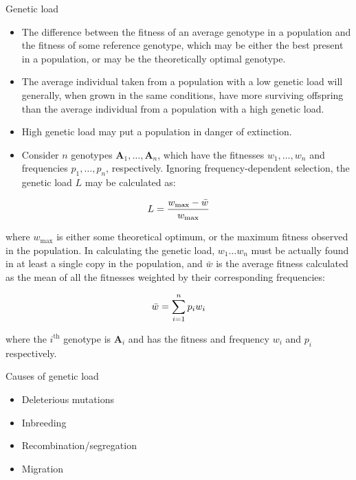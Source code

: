 \documentclass[11pt,dvipsnames,ignorenonframetext,aspectratio=169]{beamer}
\providecommand{\tightlist}{%
  \setlength{\itemsep}{0pt}\setlength{\parskip}{0pt}}
\begin{document}
\begin{frame}{Genetic load}
\protect\hypertarget{genetic-load}{}
\footnotesize

\begin{itemize}
\tightlist
\item
  The difference between the fitness of an average genotype in a
  population and the fitness of some reference genotype, which may be
  either the best present in a population, or may be the theoretically
  optimal genotype.
\item
  The average individual taken from a population with a low genetic load
  will generally, when grown in the same conditions, have more surviving
  offspring than the average individual from a population with a high
  genetic load.
\item
  High genetic load may put a population in danger of extinction.
\item
  Consider \(n\) genotypes \(\mathbf{A}_{1},\dots ,\mathbf{A}_{n}\),
  which have the fitnesses \(w_{1},\dots, w_{n}\) and frequencies
  \(p_{1},\dots, p_{n}\), respectively. Ignoring frequency-dependent
  selection, the genetic load \(L\) may be calculated as:
\end{itemize}

\[
\small
L={{w_{\max }-{\bar {w}}} \over w_{\max }}
\]
\end{frame}

\begin{frame}{}
\protect\hypertarget{section-29}{}
where \(w_{\max }\) is either some theoretical optimum, or the maximum
fitness observed in the population. In calculating the genetic load,
\(w_{1}\dots w_{n}\) must be actually found in at least a single copy in
the population, and \(\bar{w}\) is the average fitness calculated as the
mean of all the fitnesses weighted by their corresponding frequencies:

\[
\small
{\bar {w}}={\sum _{i=1}^{n}{p_{i}w_{i}}}
\]

where the \(i^\mathrm{th}\) genotype is \(\mathbf{A}_{i}\) and has the
fitness and frequency \(w_{i}\) and \(p_{i}\) respectively.
\end{frame}

\begin{frame}{Causes of genetic load}
\protect\hypertarget{causes-of-genetic-load}{}
\begin{itemize}
\tightlist
\item
  Deleterious mutations
\item
  Inbreeding
\item
  Recombination/segregation
\item
  Migration
\end{itemize}
\end{frame}
\end{document}
